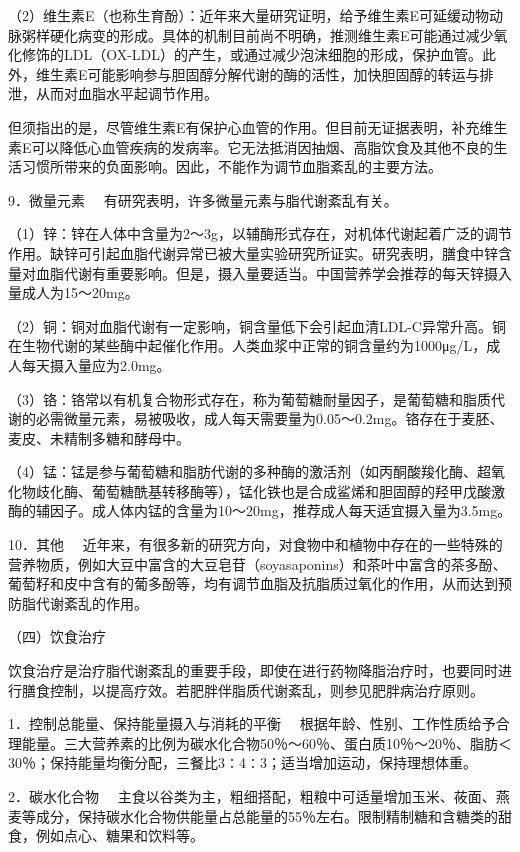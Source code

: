 （2）维生素E（也称生育酚）：近年来大量研究证明，给予维生素E可延缓动物动脉粥样硬化病变的形成。具体的机制目前尚不明确，推测维生素E可能通过减少氧化修饰的LDL（OX-LDL）的产生，或通过减少泡沫细胞的形成，保护血管。此外，维生素E可能影响参与胆固醇分解代谢的酶的活性，加快胆固醇的转运与排泄，从而对血脂水平起调节作用。

但须指出的是，尽管维生素E有保护心血管的作用。但目前无证据表明，补充维生素E可以降低心血管疾病的发病率。它无法抵消因抽烟、高脂饮食及其他不良的生活习惯所带来的负面影响。因此，不能作为调节血脂紊乱的主要方法。

{9．微量元素} 　有研究表明，许多微量元素与脂代谢紊乱有关。

（1）锌：锌在人体中含量为2～3g，以辅酶形式存在，对机体代谢起着广泛的调节作用。缺锌可引起血脂代谢异常已被大量实验研究所证实。研究表明，膳食中锌含量对血脂代谢有重要影响。但是，摄入量要适当。中国营养学会推荐的每天锌摄入量成人为15～20mg。

（2）铜：铜对血脂代谢有一定影响，铜含量低下会引起血清LDL-C异常升高。铜在生物代谢的某些酶中起催化作用。人类血浆中正常的铜含量约为1000μg/L，成人每天摄入量应为2.0mg。

（3）铬：铬常以有机复合物形式存在，称为葡萄糖耐量因子，是葡萄糖和脂质代谢的必需微量元素，易被吸收，成人每天需要量为0.05～0.2mg。铬存在于麦胚、麦皮、未精制多糖和酵母中。

（4）锰：锰是参与葡萄糖和脂肪代谢的多种酶的激活剂（如丙酮酸羧化酶、超氧化物歧化酶、葡萄糖酰基转移酶等），锰化铁也是合成鲨烯和胆固醇的羟甲戊酸激酶的辅因子。成人体内锰的含量为10～20mg，推荐成人每天适宜摄入量为3.5mg。

{10．其他}
　近年来，有很多新的研究方向，对食物中和植物中存在的一些特殊的营养物质，例如大豆中富含的大豆皂苷（soyasaponins）和茶叶中富含的茶多酚、葡萄籽和皮中含有的葡多酚等，均有调节血脂及抗脂质过氧化的作用，从而达到预防脂代谢紊乱的作用。

（四）饮食治疗

饮食治疗是治疗脂代谢紊乱的重要手段，即使在进行药物降脂治疗时，也要同时进行膳食控制，以提高疗效。若肥胖伴脂质代谢紊乱，则参见肥胖病治疗原则。

{1．控制总能量、保持能量摄入与消耗的平衡}
　根据年龄、性别、工作性质给予合理能量。三大营养素的比例为碳水化合物50％～60％、蛋白质10％～20％、脂肪＜30％；保持能量均衡分配，三餐比3∶4∶3；适当增加运动，保持理想体重。

{2．碳水化合物}
　主食以谷类为主，粗细搭配，粗粮中可适量增加玉米、莜面、燕麦等成分，保持碳水化合物供能量占总能量的55％左右。限制精制糖和含糖类的甜食，例如点心、糖果和饮料等。

